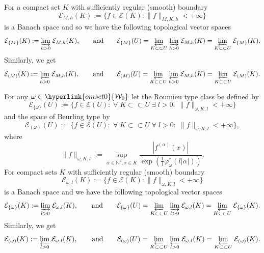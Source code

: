 \documentclass[10pt]{amsart}%
\numberwithin{equation}{section}
\theoremstyle{plain}
\newcommand{\NN}{\mathbb{N}}
\begin{document}
For a compact set $K$ with sufficiently regular (smooth) boundary
$$\mathcal{E}_{M,h}(K):=\{f\in\mathcal{E}(K): \|f\|_{M,K,h}<+\infty\}$$
is a Banach space and so we have the following topological vector spaces
$$\mathcal{E}_{\{M\}}(K):=\underset{h>0}{\varinjlim}\;\mathcal{E}_{M,h}(K), \qquad \text{and} \qquad
\mathcal{E}_{\{M\}}(U)=\underset{K\subset\subset U}{\varprojlim}\;\underset{h>0}{\varinjlim}\;\mathcal{E}_{M,h}(K)=\underset{K\subset\subset U}{\varprojlim}\;\mathcal{E}_{\{M\}}(K).$$
Similarly, we get
$$\mathcal{E}_{(M)}(K):=\underset{h>0}{\varprojlim}\;\mathcal{E}_{M,h}(K),
\qquad \text{and} \qquad
\mathcal{E}_{(M)}(U)=\underset{K\subset\subset U}{\varprojlim}\;\underset{h>0}{\varprojlim}\;\mathcal{E}_{M,h}(K)=\underset{K\subset\subset U}{\varprojlim}\;\mathcal{E}_{(M)}(K).$$

For any $\omega\in\hyperlink{omset0}{\mathcal{W}_0}$ let the Roumieu type class be defined by
$$\mathcal{E}_{\{\omega\}}(U):=\{f\in\mathcal{E}(U):\;\forall\;K\subset\subset U\;\exists\;l>0:\;\|f\|_{\omega,K,l}<+\infty\}$$
and the space of Beurling type by
$$\mathcal{E}_{(\omega)}(U):=\{f\in\mathcal{E}(U):\;\forall\;K\subset\subset U\;\forall\;l>0:\;\|f\|_{\omega,K,l}<+\infty\},$$
where
\begin{equation*}%
\|f\|_{\omega,K,l}:=\sup_{\alpha\in\NN^d,x\in K}\frac{|f^{(\alpha)}(x)|}{\exp(\frac{1}{l}\varphi^{*}_{\omega}(l|\alpha|))}.
\end{equation*}
For compact sets $K$ with sufficiently regular (smooth) boundary
$$\mathcal{E}_{\omega,l}(K):=\{f\in\mathcal{E}(K): \|f\|_{\omega,K,l}<+\infty\}$$
is a Banach space and we have the following topological vector spaces
$$\mathcal{E}_{\{\omega\}}(K):=\underset{l>0}{\varinjlim}\;\mathcal{E}_{\omega,l}(K), \qquad \text{and} \qquad
\mathcal{E}_{\{\omega\}}(U)=\underset{K\subset\subset U}{\varprojlim}\;\underset{l>0}{\varinjlim}\;\mathcal{E}_{\omega,l}(K)=\underset{K\subset\subset U}{\varprojlim}\;\mathcal{E}_{\{\omega\}}(K).$$
Similarly, we get
$$\mathcal{E}_{(\omega)}(K):=\underset{l>0}{\varprojlim}\;\mathcal{E}_{\omega,l}(K),\qquad \text{and} \qquad
\mathcal{E}_{(\omega)}(U)=\underset{K\subset\subset U}{\varprojlim}\;\underset{l>0}{\varprojlim}\;\mathcal{E}_{\omega,l}(K)=\underset{K\subset\subset U}{\varprojlim}\;\mathcal{E}_{(\omega)}(K).$$
\end{document}

